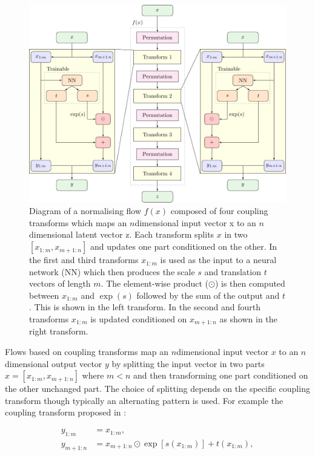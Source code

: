 \documentclass[%
 reprint,
nofootinbib,
 amsmath,amssymb,
 aps,
 prd,
]{revtex4-2}
\newcommand{\ndimensional}[1]{$#1$\nobreakdash\discretionary{-}{-}{-}dimensional}
\newcommand{\onehalffigwidth}{12.9cm}
\begin{document}
\begin{figure}
    \centering
    \includegraphics[width=\onehalffigwidth]{figures/flow_diagram.pdf}
    \caption{Diagram of a normalising flow $f(x)$ composed of four coupling transforms which maps an \protect\ndimensional{n} input vector x to an \protect\ndimensional{n} latent vector z. Each transform splits $x$ in two $[x_{1:m}, x_{m+1:n}]$ and updates one part conditioned on the other. In the first and third transforms $x_{1:m}$ is used as the input to a neural network (NN) which then produces the scale $s$ and translation $t$ vectors of length $m$. The element-wise product ($\odot$) is then computed between $x_{1:m}$ and $\exp(s)$ followed by the sum of the output and $t$. This is shown in the left transform. In the second and fourth transforms $x_{1:m}$ is updated conditioned on $x_{m+1:n}$ as shown in the right transform.}
    \label{fig:flow_diagram}
\end{figure}

Flows based on coupling transforms map an \ndimensional{n} input vector $x$ to an \ndimensional{n} output vector $y$ by splitting the input vector in two parts $x = [x_{1:m}, x_{m+1:n}]$ where $m < n$ and then transforming one part conditioned on the other unchanged part. The choice of splitting depends on the specific coupling transform though typically an alternating pattern is used. For example the coupling transform proposed in \cite{Dinh:2016:rnvp}:

\begin{subequations}\label{eq:coupling_trasnform}
    \begin{align}
        y_{1:m} & = x_{1:m}, \\
        y_{m+1:n} & = x_{m+1:n} \odot \exp \left[ s(x_{1:m})\right] + t(x_{1:m}),  
    \end{align}
\end{subequations}
\end{document}
